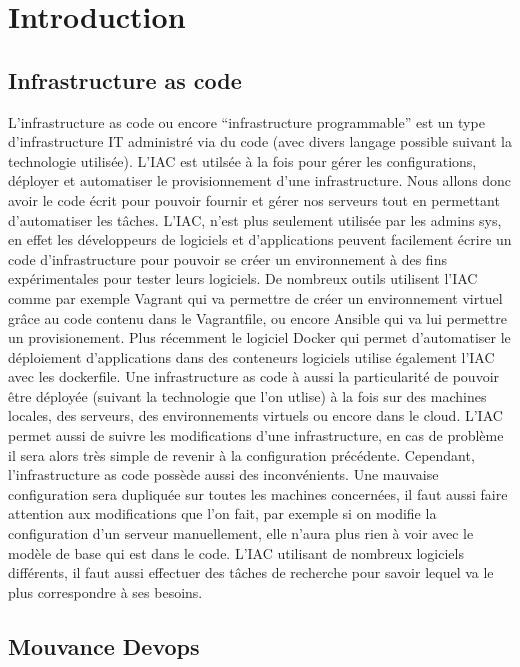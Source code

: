 \documentclass[]{article}
\date{}
\begin{document}
\tableofcontents

\newpage
\section{Introduction}\label{introduction}

\subsection{Infrastructure as code}\label{infrastructure-as-code}

L'infrastructure as code ou encore ``infrastructure programmable'' est
un type d'infrastructure IT administré via du code (avec divers langage
possible suivant la technologie utilisée). L'IAC est utilsée à la fois
pour gérer les configurations, déployer et automatiser le
provisionnement d'une infrastructure. Nous allons donc avoir le code
écrit pour pouvoir fournir et gérer nos serveurs tout en permettant
d'automatiser les tâches. L'IAC, n'est plus seulement utilisée par les
admins sys, en effet les développeurs de logiciels et d'applications
peuvent facilement écrire un code d'infrastructure pour pouvoir se créer
un environnement à des fins expérimentales pour tester leurs logiciels.
De nombreux outils utilisent l'IAC comme par exemple Vagrant qui va
permettre de créer un environnement virtuel grâce au code contenu dans
le Vagrantfile, ou encore Ansible qui va lui permettre un
provisionement. Plus récemment le logiciel Docker qui permet
d'automatiser le déploiement d'applications dans des conteneurs
logiciels utilise également l'IAC avec les dockerfile. Une
infrastructure as code à aussi la particularité de pouvoir être déployée
(suivant la technologie que l'on utlise) à la fois sur des machines
locales, des serveurs, des environnements virtuels ou encore dans le
cloud. L'IAC permet aussi de suivre les modifications d'une
infrastructure, en cas de problème il sera alors très simple de revenir
à la configuration précédente. Cependant, l'infrastructure as code
possède aussi des inconvénients. Une mauvaise configuration sera
dupliquée sur toutes les machines concernées, il faut aussi faire
attention aux modifications que l'on fait, par exemple si on modifie la
configuration d'un serveur manuellement, elle n'aura plus rien à voir
avec le modèle de base qui est dans le code. L'IAC utilisant de nombreux
logiciels différents, il faut aussi effectuer des tâches de recherche
pour savoir lequel va le plus correspondre à ses besoins.

\subsection{Mouvance Devops}\label{mouvance-devops}
\end{document}

